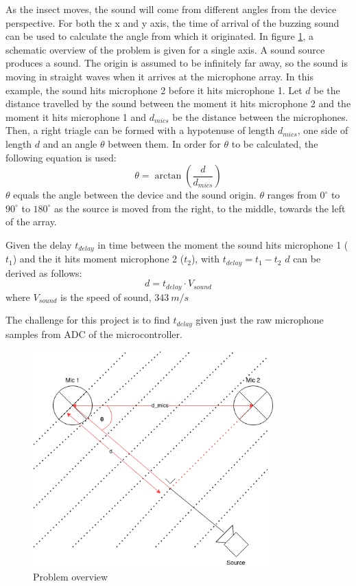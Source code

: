 \documentclass[a4paper]{article}
\begin{document}
As the insect moves, the sound will come from different angles from the device perspective. For both the x and y axis, the time of arrival of the buzzing sound can be used to calculate the angle from which it originated. In figure \ref{fig:problem_overview}, a schematic overview of the problem is given for a single axis. A sound source produces a sound. The origin is assumed to be infinitely far away, so the sound is moving in straight waves when it arrives at the microphone array. In this example, the sound hits microphone 2 before it hits microphone 1. Let $d$ be the distance travelled by the sound between the moment it hits microphone 2 and the moment it hits microphone 1 and $d_{mics}$ be the distance between the microphones. Then, a right triagle can be formed with a hypotenuse of length $d_{mics}$, one side of length $d$ and an angle $\theta$ between them. In order for $\theta$ to be calculated, the following equation is used:\[\theta = \arctan(\frac{d}{d_{mics}})\] $\theta$ equals the angle between the device and the sound origin. $\theta$ ranges from $0^{\circ}$ to $90^{\circ}$ to $180^{\circ}$ as the source is moved from the right, to the middle, towards the left of the array. 

Given the delay $t_{delay}$ in time between the moment the sound hits microphone 1 ($t_1$) and the it hits moment microphone 2 ($t_2$), with $t_{delay} = t_1 - t_2$ $d$ can be derived as follows:\[d = t_{delay} \cdot V_{sound}\]where $V_{sound}$ is the speed of sound, $343\ m/s$

The challenge for this project is to find $t_{delay}$ given just the raw microphone samples from ADC of the microcontroller. 

\begin{figure}
    \begin{center}
        \includegraphics[width=25em]{assets/problem_overview.png}
        \caption{Problem overview}
        \label{fig:problem_overview}
    \end{center}
\end{figure}
\end{document}
